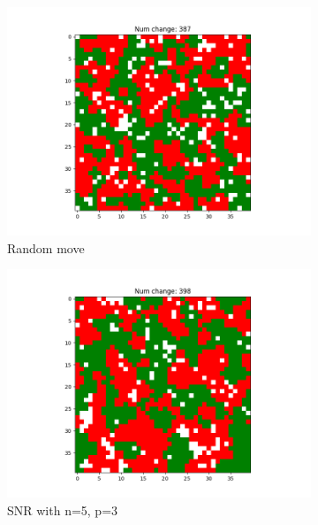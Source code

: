 \documentclass[11pt]{article}
\begin{document}
	\begin{figure}[h]
		\centering
		\begin{subfigure}{0.14\textwidth}
			\includegraphics[width=\linewidth]{final_random.png}
			\caption{\centering Random move}
		\end{subfigure}\hfill
		\begin{subfigure}{0.14\textwidth}
			\includegraphics[width=\linewidth]{final_social_n5p3.png}
			\caption{\centering SNR with n=5, p=3}
		\end{subfigure}\hfill
		\begin{subfigure}{0.14\textwidth}

\end{subfigure}
\end{figure}
\end{document}
